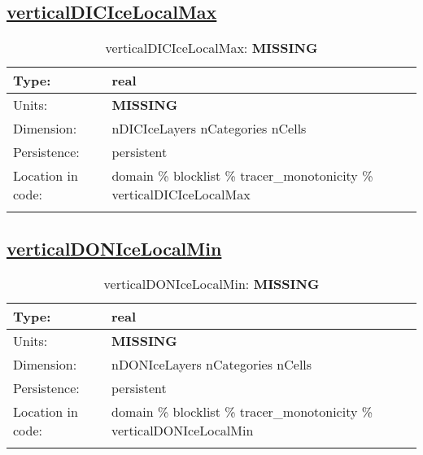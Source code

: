 \subsection[verticalDICIceLocalMax]{\hyperref[sec:var_tab_tracer_monotonicity]{verticalDICIceLocalMax}}
\label{subsec:var_sec_tracer_monotonicity_verticalDICIceLocalMax}
\begin{center}
\begin{longtable}{| p{2.0in} | p{4.0in} |}
        \hline 
        Type: & real \\
        \hline 
        Units: & {\bf \color{red} MISSING} \\
        \hline 
        Dimension: & nDICIceLayers nCategories nCells \\
        \hline 
        Persistence: & persistent \\
        \hline 
         Location in code: & domain \% blocklist \% tracer\_monotonicity \% verticalDICIceLocalMax \\
         \hline 
    \caption{verticalDICIceLocalMax: {\bf \color{red} MISSING}}
\end{longtable}
\end{center}
\subsection[verticalDONIceLocalMin]{\hyperref[sec:var_tab_tracer_monotonicity]{verticalDONIceLocalMin}}
\label{subsec:var_sec_tracer_monotonicity_verticalDONIceLocalMin}
\begin{center}
\begin{longtable}{| p{2.0in} | p{4.0in} |}
        \hline 
        Type: & real \\
        \hline 
        Units: & {\bf \color{red} MISSING} \\
        \hline 
        Dimension: & nDONIceLayers nCategories nCells \\
        \hline 
        Persistence: & persistent \\
        \hline 
         Location in code: & domain \% blocklist \% tracer\_monotonicity \% verticalDONIceLocalMin \\
         \hline 
    \caption{verticalDONIceLocalMin: {\bf \color{red} MISSING}}
\end{longtable}
\end{center}
